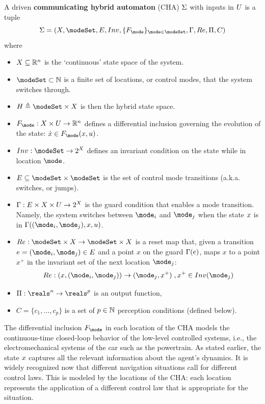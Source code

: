 \begin{defn}
	\label{def:CHA}
A driven \textbf{communicating hybrid automaton} (CHA) $\Sigma$ with inputs in $U$ 
is a tuple 
\[\Sys = (\stSet, \modeSet, E, Inv, \{F_\mode\}_{\mode \in \modeSet}, \guard, \reset, \funcOut, C)\]
where 
\begin{itemize}
	\item $X \subseteq \mathbb{R}^n$ is the `continuous' state space of the system.
	\item $\modeSet \subset \Ne$ is a finite set of locations, or control modes, that the system switches through. 
	\item $\hsSet \triangleq \modeSet \times \stSet$ is then the hybrid state space.
	\item $F_\mode : \stSet \times \inpSet \rightarrow \Re^n$ defines a differential inclusion governing the evolution of the state: $\dot{\stPt} \in F_\mode(\stPt,u)$. 
	\item $Inv : \modeSet \rightarrow 2^\stSet$ defines an invariant condition on the state while in location $\mode$.
	\item $E \subseteq \modeSet \times \modeSet$ is the set of control mode transitions (a.k.a. switches, or jumps).
	\item $\Gamma : E \times X \times U \rightarrow 2^X$ is the guard condition that enables a mode transition. 
	Namely, the system switches between $\mode _i$ and $\mode _j$ when the state $x$ is in $\guard((\mode_i,\mode _j),x,u)$.
	\item $\reset : \modeSet \times \stSet \rightarrow \modeSet \times \stSet $ is a reset map that, given a transition $e = (\mode _i,\mode _j) \in E$ and a point $x$ on the guard $\Gamma(e)$, maps $x$ to a point $x^+$ in the invariant set of the next location $\mode_j$:
	\[\reset: (x,(\mode _i,\mode _j)) \rightarrow (\mode_j,x^+)\;, x^+ \in Inv(\mode_j)\] 
	\item $\funcOut: \reals^n \rightarrow \reals^p$ is an output function,
	\item $C = \{c_1,\ldots,c_p\}$ is a set of $p \in \mathbb{N}$ perception conditions (defined below).	
\end{itemize}
\end{defn}

The differential inclusion $F_\mode$ in each location of the CHA models the continuous-time closed-loop behavior of the low-level controlled systems, i.e., the electromechanical systems of the car such as the powertrain.
As stated earlier, the state $x$ captures all the relevant information about the agent's dynamics. 
It is widely recognized now that different navigation situations call for different control laws.
This is modeled by the locations of the CHA: each location represents the application of a different control law that is appropriate for the situation.

